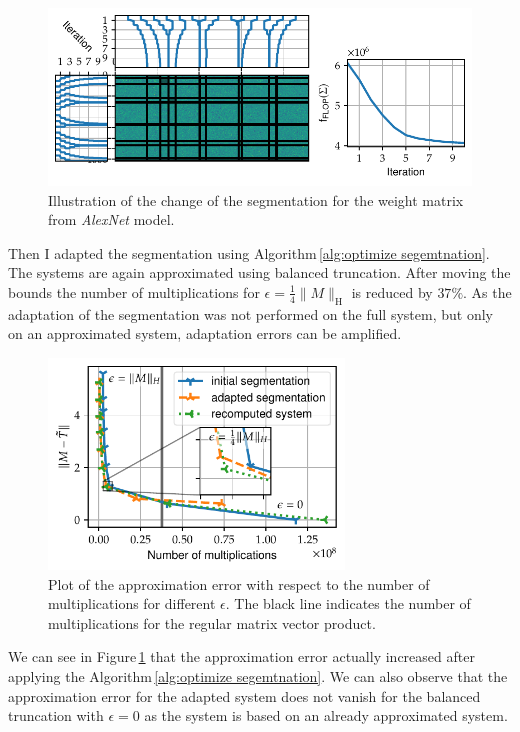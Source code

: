 \documentclass[doctype=mastersthesis,BCOR=15mm,biblatex]{ldvbook}%
\begin{document}
\begin{figure}[!htb]
	\centering
	\includegraphics[width=\textwidth]{Plots/move_example_alexnet_comp.pdf}
	\caption{Illustration of the change of the segmentation for the weight matrix from \emph{AlexNet} model.
	}
	\label{fig:alexnet_seperation_comp}
\end{figure}
Then I adapted the segmentation using Algorithm\,\ref{alg:optimize segemtnation}.
The systems are again approximated using balanced truncation.
After moving the bounds the number of multiplications for $\epsilon = \frac{1}{4}\|M\|_\text{H}$ is reduced by $37\%$.
As the adaptation of the segmentation was not performed on the full system, but only on an approximated system, adaptation errors can be amplified.
\begin{figure}[!htb]
	\centering
	\includegraphics[width=0.7\textwidth]{Plots/move_example_alexnet_error.pdf}
	\caption{Plot of the approximation error with respect to the number of multiplications for different $\epsilon$. 
		The black line indicates the number of multiplications for the regular matrix vector product. 
	}
	\label{fig:allexnet_err_cost}
\end{figure}
We can see in Figure\,\ref{fig:alexnet_seperation_comp} that the approximation error actually increased after applying the Algorithm\,\ref{alg:optimize segemtnation}.
We can also observe that the approximation error for the adapted system does not vanish for the balanced truncation with $\epsilon = 0$ as the system is based on an already approximated system.
\end{document}
